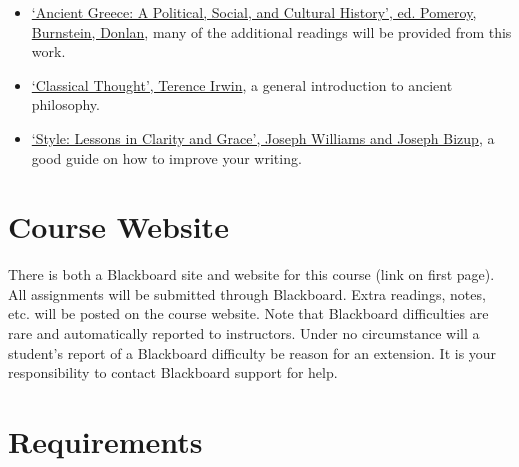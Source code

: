\documentclass[article,oneside]{memoir}
\begin{document}
\begin{itemize}
\item \href{https://a.co/d/fxAx3Gk}{`Ancient Greece: A Political, Social, and Cultural History', ed. Pomeroy, Burnstein, Donlan}, many of the additional readings will be provided from this work. 


\item \href{https://www.amazon.com/Classical-Thought-History-Western-Philosophy/dp/0192891774/ref=sr_1_1?s=books&ie=UTF8&qid=1515009994&sr=1-1&keywords=classical+thought}{`Classical Thought', Terence Irwin}, a general introduction to ancient philosophy.


\item \href{http://www.amazon.com/Style-Lessons-Clarity-Grace-11th/dp/0321898680/ref=sr_1_1?ie=UTF8&qid=1452356026&sr=8-1&keywords=lessons+in+clarity+and+grace}{`Style: Lessons in Clarity and Grace', Joseph Williams and Joseph Bizup}, a good guide on how to improve your writing. 


\end{itemize}
\section{Course Website}
There is both a Blackboard site and website for this course (link on first page). All assignments will be submitted through Blackboard. Extra readings, notes, etc. will be posted on the course website. Note that Blackboard difficulties are rare and automatically reported to instructors. Under no circumstance will a student's report of a Blackboard difficulty be reason for an extension. It is your responsibility to contact Blackboard support for help.


\section{Requirements}
\end{document}
